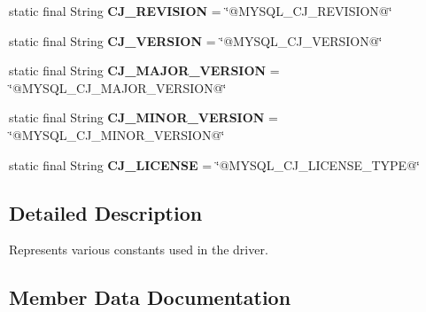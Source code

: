 \begin{DoxyCompactItemize}
\item 
\mbox{\label{classcom_1_1mysql_1_1cj_1_1_constants_aaef32399ccf062bb3b40e6fae6e49859}} 
static final String {\bfseries C\+J\+\_\+\+R\+E\+V\+I\+S\+I\+ON} = \char`\"{}@M\+Y\+S\+Q\+L\+\_\+\+C\+J\+\_\+\+R\+E\+V\+I\+S\+I\+ON@\char`\"{}
\item 
\mbox{\label{classcom_1_1mysql_1_1cj_1_1_constants_a424c01aee825cf22fefff13a8f9ce294}} 
static final String {\bfseries C\+J\+\_\+\+V\+E\+R\+S\+I\+ON} = \char`\"{}@M\+Y\+S\+Q\+L\+\_\+\+C\+J\+\_\+\+V\+E\+R\+S\+I\+ON@\char`\"{}
\item 
\mbox{\label{classcom_1_1mysql_1_1cj_1_1_constants_abf0a3841d1e94bbed47436e7e62b9c0d}} 
static final String {\bfseries C\+J\+\_\+\+M\+A\+J\+O\+R\+\_\+\+V\+E\+R\+S\+I\+ON} = \char`\"{}@M\+Y\+S\+Q\+L\+\_\+\+C\+J\+\_\+\+M\+A\+J\+O\+R\+\_\+\+V\+E\+R\+S\+I\+ON@\char`\"{}
\item 
\mbox{\label{classcom_1_1mysql_1_1cj_1_1_constants_ab41d1729b84c021713359e3026b7958a}} 
static final String {\bfseries C\+J\+\_\+\+M\+I\+N\+O\+R\+\_\+\+V\+E\+R\+S\+I\+ON} = \char`\"{}@M\+Y\+S\+Q\+L\+\_\+\+C\+J\+\_\+\+M\+I\+N\+O\+R\+\_\+\+V\+E\+R\+S\+I\+ON@\char`\"{}
\item 
\mbox{\label{classcom_1_1mysql_1_1cj_1_1_constants_ada028846df5654105fdaf3ec2a385476}} 
static final String {\bfseries C\+J\+\_\+\+L\+I\+C\+E\+N\+SE} = \char`\"{}@M\+Y\+S\+Q\+L\+\_\+\+C\+J\+\_\+\+L\+I\+C\+E\+N\+S\+E\+\_\+\+T\+Y\+PE@\char`\"{}
\end{DoxyCompactItemize}


\subsection{Detailed Description}
Represents various constants used in the driver. 

\subsection{Member Data Documentation}
\mbox{\label{classcom_1_1mysql_1_1cj_1_1_constants_abc80f5c092cffb1a8a0f80f19e9eacf1}} 
